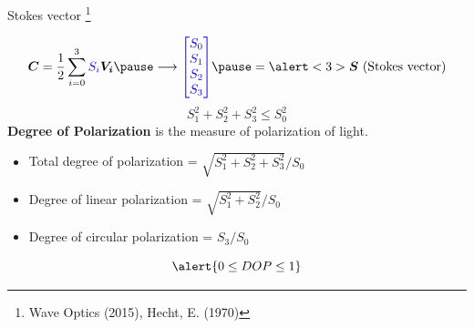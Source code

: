 \documentclass[12pt, dvipsnames]{beamer}
\numberwithin{equation}{section}
\newcommand\blfootnote[1]{%
	\begingroup
	\renewcommand\thefootnote{}\footnote{#1}%
	\addtocounter{footnote}{-1}%
	\endgroup
}
\begin{document}

\begin{frame}[t]{Stokes vector}\blfootnote{Wave Optics (2015), Hecht, E. (1970) }
	$$\boldsymbol{C} = \frac{1}{2} \sum_{i=0}^{3} {\color{blue}S_i} \boldsymbol{V_i}\pause \longrightarrow {\color{blue}\begin{bmatrix} S_0\\ S_1\\ S_2\\S_3\end{bmatrix}}\pause = \alert<3>{\boldsymbol{S} \text{ (Stokes vector)}}$$\pause
	\alert<4,10>{$$S_1^2+S_2^2+S_3^2\le S_0^2$$}\pause
	\textbf{Degree of Polarization} \pause is the measure of polarization of light.\pause
	
	\begin{itemize}
		\item Total degree of polarization = $\sqrt{S_1^2+S_2^2+S_3^2}/S_0$\pause
		\item Degree of linear polarization = $\sqrt{S_1^2+S_2^2}/S_0$\pause
		\item Degree of circular polarization = $S_3/S_0$\pause
	\end{itemize}
	$$\alert{0\le DOP\le1}$$
	
\end{frame}
\end{document}
